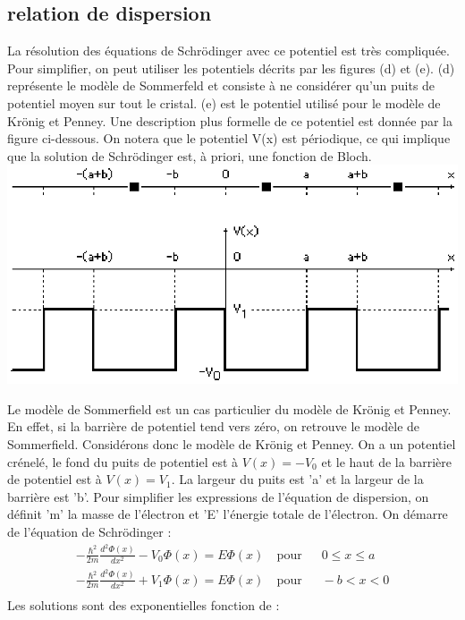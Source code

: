\begin{enumerate}
\subsection{relation de dispersion}
La résolution des équations de Schrödinger avec ce potentiel est très compliquée. Pour simplifier, on peut utiliser les potentiels décrits par les figures (d) et (e). (d) représente le modèle de Sommerfeld et consiste à ne considérer qu'un puits de potentiel moyen sur tout le cristal. (e) est le potentiel utilisé pour le modèle de Krönig et Penney. Une description plus formelle de ce potentiel est donnée par la figure ci-dessous. On notera que le potentiel V(x) est périodique, ce qui implique que la solution de Schrödinger est, à priori, une fonction de Bloch. \\
\includegraphics[scale=0.8]{cronig.eps} \\
\end{enumerate}
Le modèle de Sommerfield est un cas particulier du modèle de Krönig et Penney. En effet, si la barrière de potentiel tend vers zéro, on retrouve le modèle de Sommerfield. Considérons donc le modèle de Krönig et Penney. On a un potentiel crénelé, le fond du puits de potentiel est à $V(x)=-V_0$ et le haut de la barrière de potentiel est à $V(x)=V_1$. La largeur du puits est 'a' et la largeur de la barrière est 'b'. Pour simplifier les expressions de l'équation de dispersion, on définit  'm' la masse de l'électron et 'E' l'énergie totale de l'électron.  On démarre de l'équation de Schrödinger :
\begin{eqnarray}
- \frac{\hbar^2}{2m} \frac{d^2 \Phi(x)}{dx^2} - V_0 \Phi(x) = E \Phi(x) & \ \mbox{pour } \ & \ 0 \leq x \leq a \\ 
- \frac{\hbar^2}{2m} \frac{d^2 \Phi(x)}{dx^2} + V_1 \Phi(x) = E \Phi(x) & \ \mbox{pour } \ & \ -b < x < 0 \\ 
\end{eqnarray}
Les solutions sont des exponentielles fonction de :
